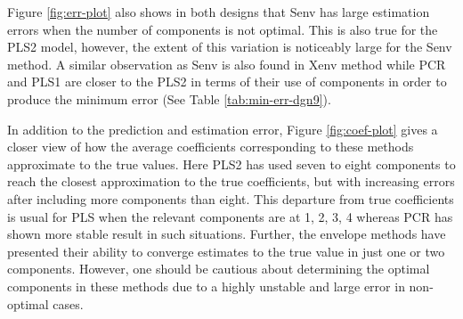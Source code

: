 \documentclass[12pt,3p,authoryear]{elsarticle}
\begin{document}
Figure \ref{fig:err-plot} also shows in both designs that Senv has large
estimation errors when the number of components is not optimal. This is
also true for the PLS2 model, however, the extent of this variation is
noticeably large for the Senv method. A similar observation as Senv is
also found in Xenv method while PCR and PLS1 are closer to the PLS2 in
terms of their use of components in order to produce the minimum error
(See Table \ref{tab:min-err-dgn9}).

In addition to the prediction and estimation error, Figure
\ref{fig:coef-plot} gives a closer view of how the average coefficients
corresponding to these methods approximate to the true values. Here PLS2
has used seven to eight components to reach the closest approximation to
the true coefficients, but with increasing errors after including more
components than eight. This departure from true coefficients is usual
for PLS when the relevant components are at 1, 2, 3, 4 whereas PCR has
shown more stable result in such situations. Further, the envelope
methods have presented their ability to converge estimates to the true
value in just one or two components. However, one should be cautious
about determining the optimal components in these methods due to a
highly unstable and large error in non-optimal cases.
\end{document}
